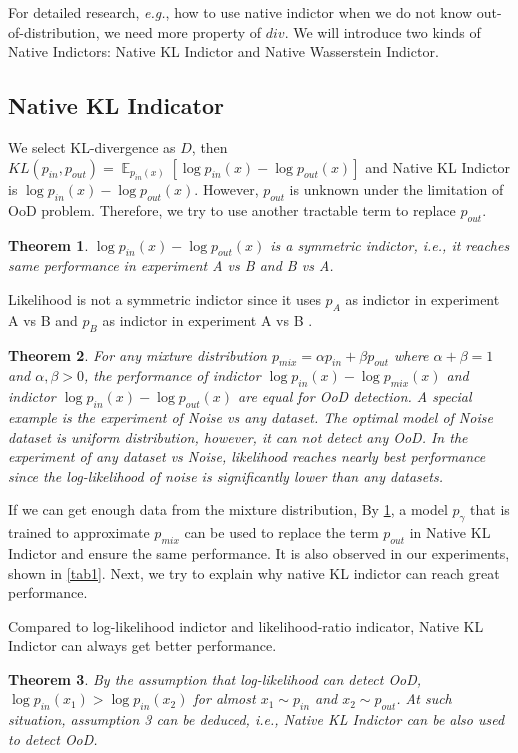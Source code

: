 \documentclass[letterpaper]{article} %
\newtheorem{theorem}{Theorem}
\newcommand{\IE}{\textit{i.e.}, }
\newcommand{\EG}{\textit{e.g.}, }
\newcommand{\E}{\operatorname{\mathbb{E}}}
\newcommand{\pin}{p_{in}}
\newcommand{\pout}{p_{out}}
\newcommand{\pmix}{p_{mix}}
\begin{document}
For detailed research, \EG how to use native indictor when we do not know out-of-distribution, we need more property of $div$. 
We will introduce two kinds of Native Indictors: Native KL Indictor and Native Wasserstein Indictor. 

\subsection{Native KL Indicator}
We select KL-divergence as $D$, then $KL(\pin, \pout) = \E_{\pin(x)} [\log \pin(x) - \log \pout(x)]$ and Native KL Indictor is $\log \pin(x) - \log \pout(x)$. However, $\pout$ is unknown under the limitation of OoD problem. Therefore, we try to use another tractable term to replace $\pout$. 

\begin{theorem}\label{thm1}
	$\log \pin(x) - \log \pout(x)$ is a symmetric indictor, \IE it reaches same performance in experiment A vs B and B vs A.  
\end{theorem}

Likelihood is not a symmetric indictor since it uses $p_A$ as indictor in experiment A vs B and $p_B$ as indictor in experiment A vs B . 

\begin{theorem}\label{thm2}
	For any mixture distribution $\pmix = \alpha \pin + \beta \pout$ where $\alpha + \beta = 1$ and $\alpha, \beta > 0$, the performance of indictor $\log \pin(x) - \log \pmix(x)$ and indictor $\log \pin(x) - \log \pout(x)$ are equal for OoD detection. A special example is the experiment of Noise vs any dataset. The optimal model of Noise dataset is uniform distribution, however, it can not detect any OoD. In the experiment of any dataset vs Noise, likelihood reaches nearly best performance since the log-likelihood of noise is significantly lower than any datasets. 
\end{theorem}

If we can get enough data from the mixture distribution, By \cref{thm1}, a model $p_\gamma$ that is trained to approximate $\pmix$ can be used to replace the term $\pout$ in Native KL Indictor and ensure the same performance. It is also observed in our experiments, shown in \cref{tab1}. Next, we try to explain why native KL indictor can reach great performance.

Compared to log-likelihood indictor and likelihood-ratio indicator, Native KL Indictor can always get better performance. 
\begin{theorem}\label{thm3}
By the assumption that log-likelihood can detect OoD, $\log \pin(x_1) > \log \pin(x_2)$ for almost $x_1 \sim \pin$ and $x_2 \sim \pout$. At such situation, assumption 3 can be deduced, \IE Native KL Indictor can be also used to detect OoD. 
\end{theorem}
\end{document}
